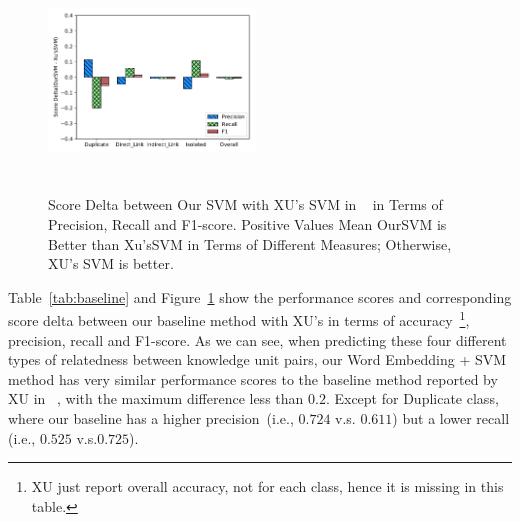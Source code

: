 \documentclass[sigconf,review, anonymous]{acmart}
\theoremstyle{break}
\newcommand{\fig}[1]{Figure~\ref{fig:#1}}
\newcommand{\tab}[1]{Table~\ref{tab:#1}}
\begin{document}
\begin{figure}[!htp]
    \centering
     \includegraphics[width=0.49\textwidth,height=2.3in]{pic/OurSVM-Xu'sSVM.pdf} %
    \caption{Score Delta between Our SVM with XU's SVM in ~\cite{xu2016predicting} in Terms of Precision, Recall and F1-score. Positive Values Mean
            OurSVM is Better than Xu'sSVM in Terms of Different Measures; Otherwise, XU's SVM is better.}
    \label{fig:OurSVM-Xu'sSVM}
\end{figure}









 \tab{baseline}  and \fig{OurSVM-Xu'sSVM} show the performance scores and corresponding score delta between our baseline method with
 XU's in terms of accuracy~\footnote{XU just report overall accuracy, not for each class, hence it is missing in this table.}, precision, recall and F1-score. As we can see, 
 when predicting these four different types of relatedness between knowledge unit pairs,
 our Word Embedding + SVM method has  very  similar performance scores to the baseline method
 reported by XU in ~\cite{xu2016predicting}, with the maximum difference less than $0.2$.  
 Except for { Duplicate} class, where our baseline 
has a higher precision~(i.e., $0.724$ v.s. $0.611$) but a lower  recall (i.e., $0.525$ v.s.$0.725$). 
\end{document}
